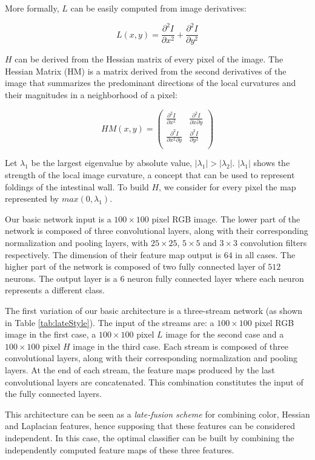 \documentclass[review,12pt,3p]{elsarticle}
\begin{document}
More formally, $L$ can be easily computed from image derivatives:

$$ L(x,y) = \frac{\partial^2 I}{\partial x^2} +\frac{\partial^2 I}{\partial y^2} $$

$H$ can be derived from the Hessian matrix of every pixel of the image. The Hessian Matrix (HM) is a matrix derived from the second derivatives of the image that summarizes the predominant directions of the local curvatures and their magnitudes in a neighborhood of a pixel:

$$
HM(x,y) = 
\left( \begin{array}{cc}
\frac{\partial^2 I}{\partial x^2} & \frac{\partial^2 I}{\partial x \partial y}  \\
\frac{\partial^2 I}{\partial x^2 \partial y} & \frac{\partial^2 I}{\partial y^2}  \\ \end{array} \right)
$$

Let $\lambda_1$ be the largest eigenvalue by absolute value, $|\lambda_1| > |\lambda_2|$. $|\lambda_1|$ shows the strength of the local image curvature, a concept that can be used to represent foldings of the intestinal wall. To build $H$,  we consider for
every pixel the map represented by $max(0, \lambda_1)$. 

Our basic network input is a $100 \times 100$ pixel RGB image. The lower part of the network is composed of three convolutional layers, along with their corresponding normalization and pooling layers, with $25 \times 25$, $5 \times 5$ and $3 \times 3$ convolution filters respectively.  The dimension of their feature map output is $64$ in all cases. The higher part of the network is composed of two fully connected layer of $512$ neurons. The output layer is a $6$ neuron fully connected layer where each neuron represents a different class.

The first variation of our basic architecture is a three-stream network (as shown in Table \ref{tab:lateStyle}). The input of the streams are: a  $100 \times 100$ pixel RGB image in the first case, a $100 \times 100$ pixel $L$ image for the second case and a $100 \times 100$ pixel $H$ image in the third case. Each stream is composed of three convolutional layers, along with their corresponding normalization and pooling layers. At the end of each stream, the feature maps produced by the last convolutional layers are concatenated. This combination constitutes the input of the fully connected layers.

This architecture can be seen as a {\em late-fusion scheme} for combining color, Hessian and Laplacian features, hence supposing that these features can be considered independent. In this case, the optimal classifier can be built by combining the independently computed feature maps of these three features. 
\end{document}
